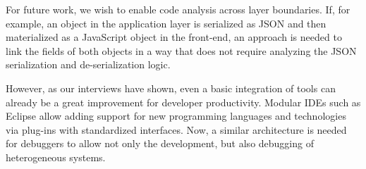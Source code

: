 \documentclass[
      english,
			conference,
      ]{IEEEtran}
\begin{document}
For future work, we wish to enable code analysis across layer boundaries.
If, for example, an object in the application layer is serialized as JSON and then materialized as a JavaScript object in the front-end, an approach is needed to link the fields of both objects in a way that does not require analyzing the JSON serialization and de-serialization logic.

However, as our interviews have shown, even a basic integration of tools can already be a great improvement for developer productivity.
Modular IDEs such as Eclipse allow adding support for new programming languages and technologies via plug-ins with standardized interfaces.
Now, a similar architecture is needed for debuggers to allow not only the development, but also debugging of heterogeneous systems.




\end{document}
